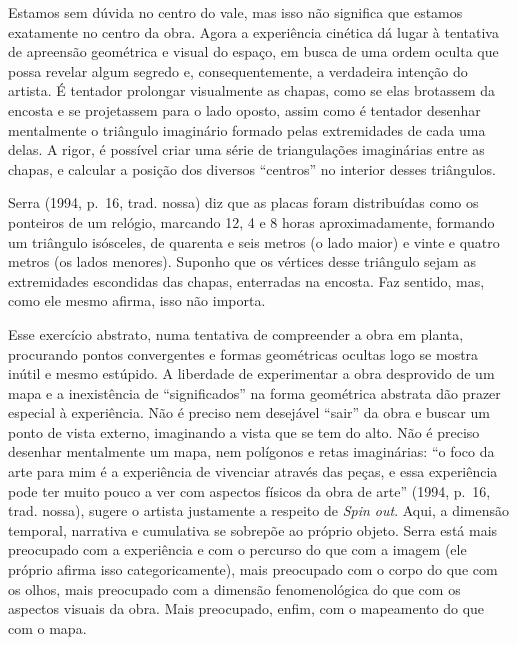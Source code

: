 Estamos sem dúvida no centro do vale, mas isso não significa que estamos
exatamente no centro da obra. Agora a experiência cinética dá lugar à
tentativa de apreensão geométrica e visual do espaço, em busca de uma
ordem oculta que possa revelar algum segredo e, consequentemente, a
verdadeira intenção do artista. É tentador prolongar visualmente as
chapas, como se elas brotassem da encosta e se projetassem para o lado
oposto, assim como é tentador desenhar mentalmente o triângulo
imaginário formado pelas extremidades de cada uma delas. A rigor, é
possível criar uma série de triangulações imaginárias entre as chapas, e
calcular a posição dos diversos ``centros'' no interior desses
triângulos.

Serra (1994, p.~16, trad. nossa) diz que as placas foram distribuídas
como os ponteiros de um relógio, marcando 12, 4 e 8 horas
aproximadamente, formando um triângulo isósceles, de quarenta e seis
metros (o lado maior) e vinte e quatro metros (os lados menores).
Suponho que os vértices desse triângulo sejam as extremidades escondidas
das chapas, enterradas na encosta. Faz sentido, mas, como ele mesmo
afirma, isso não importa.

Esse exercício abstrato, numa tentativa de compreender a obra em planta,
procurando pontos convergentes e formas geométricas ocultas logo se
mostra inútil e mesmo estúpido. A liberdade de experimentar a obra
desprovido de um mapa e a inexistência de ``significados'' na forma
geométrica abstrata dão prazer especial à experiência. Não é preciso nem
desejável ``sair'' da obra e buscar um ponto de vista externo,
imaginando a vista que se tem do alto. Não é preciso desenhar
mentalmente um mapa, nem polígonos e retas imaginárias: ``o foco da arte
para mim é a experiência de vivenciar através das peças, e essa
experiência pode ter muito pouco a ver com aspectos físicos da obra de
arte'' (1994, p.~16, trad. nossa), sugere o artista justamente a
respeito de \emph{Spin out}. Aqui, a dimensão temporal, narrativa e
cumulativa se sobrepõe ao próprio objeto. Serra está mais preocupado com
a experiência e com o percurso do que com a imagem (ele próprio afirma
isso categoricamente), mais preocupado com o corpo do que com os olhos,
mais preocupado com a dimensão fenomenológica do que com os aspectos
visuais da obra. Mais preocupado, enfim, com o mapeamento do que com o
mapa.

